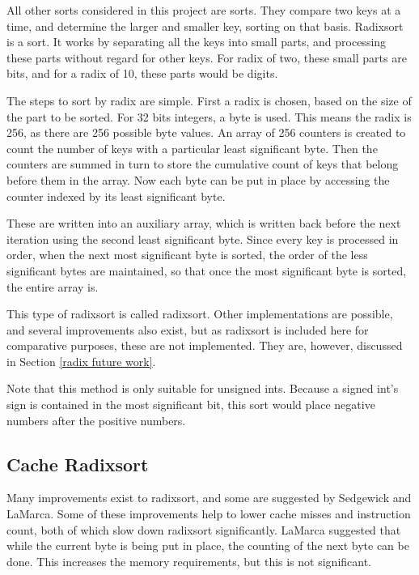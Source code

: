 \label{Radixsort}

All other sorts considered in this project are  sorts.
They compare two keys at a time, and determine the larger and smaller key,
sorting on that basis. Radixsort is a  sort. It works by
separating all the keys into small parts, and processing these parts without
regard for other keys. For radix of two, these small parts are bits, and for a
radix of 10, these parts would be digits. 

The steps to sort by radix are simple. First a radix is chosen, based on the
size of the part to be sorted. For 32 bits integers, a byte is used. This means
the radix is 256, as there are 256 possible byte values. An array of 256
counters is created to count the number of keys with a particular least
significant byte. Then the counters are summed in turn to store the cumulative
count of keys that belong before them in the array. Now each byte can be put in
place by accessing the counter indexed by its least significant byte.

These are written into an auxiliary array, which is written back before the next
iteration using the second least significant byte. Since every key is processed
in order, when the next most significant byte is sorted, the order of the less
significant bytes are maintained, so that once the most significant byte is
sorted, the entire array is.

This type of radixsort is called  radixsort.
Other implementations are possible, and several improvements also exist, but as
radixsort is included here for comparative purposes, these are not implemented.
They are, however, discussed in Section \ref{radix future work}.

Note that this method is only suitable for unsigned ints. Because a signed int's
sign is contained in the most significant bit, this sort would place negative
numbers after the positive numbers.

\subsection{Cache Radixsort}
Many improvements exist to radixsort, and some are suggested by Sedgewick and
LaMarca. Some of these improvements help to lower cache misses and instruction
count, both of which slow down radixsort significantly. LaMarca suggested
that while the current byte is being put in place, the counting of the next byte
can be done. This increases the memory requirements, but this is not
significant.

